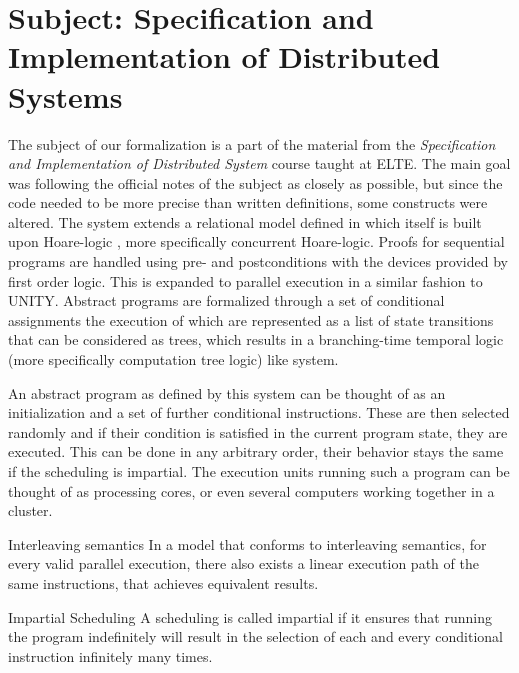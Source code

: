 \section{Subject: Specification and Implementation of Distributed Systems}
\label{sec:subject}

The subject of our formalization is a part of the material from the \textit{Specification and Implementation of Distributed System} course taught at ELTE. The main goal was following the official notes of the subject\cite{hz-orsi} as closely as possible, but since the code needed to be more precise than written definitions, some constructs were altered. The system extends a relational model defined in \cite{fothi-prog} which itself is built upon Hoare-logic \cite{hoare1978proof}\cite{hoare-logic}, more specifically concurrent Hoare-logic\cite{Lamport1980}. Proofs for sequential programs are handled using pre- and postconditions with the devices provided by first order logic. This is expanded to parallel execution in a similar fashion to UNITY. Abstract programs are formalized through a set of conditional assignments the execution of which are represented as a list of state transitions that can be considered as trees, which results in a branching-time temporal logic \cite{emerson1988branching} (more specifically computation tree logic) like system.

An abstract program as defined by this system can be thought of as an initialization and a set of further conditional instructions. These are then selected randomly and if their condition is satisfied in the current program state, they are executed. This can be done in any arbitrary order, their behavior stays the same if the scheduling is impartial. The execution units running such a program can be thought of as processing cores, or even several computers working together in a cluster.

\begin{definition}{Interleaving semantics}
\label{def:interleaving-semantics}
In a model that conforms to interleaving semantics, for every valid parallel execution, there also exists a linear execution path of the same instructions, that achieves equivalent results.
\end{definition}

\begin{definition}{Impartial Scheduling}
\label{def:impartial-scheduling}
A scheduling is called impartial if it ensures that running the program indefinitely will result in the selection of each and every conditional instruction infinitely many times.
\end{definition}

